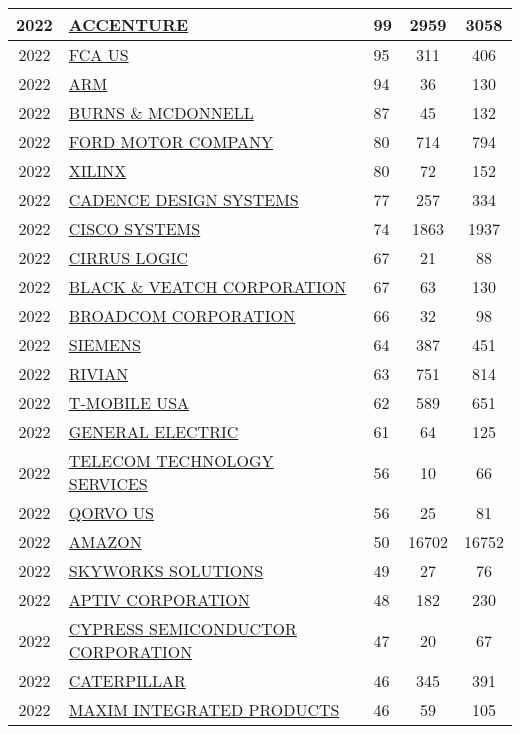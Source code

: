 \documentclass{article}%
\begin{document}
\begin{longtable}{c|p{20em}|p{5em}|c|c}
\hline%
2022&\hyperref[subsec:ACCENTURE]{ACCENTURE}&99&2959&3058\\%
\hline%
2022&\hyperref[subsec:FCAUS]{FCA US}&95&311&406\\%
\hline%
2022&\hyperref[subsec:ARM]{ARM}&94&36&130\\%
\hline%
2022&\hyperref[subsec:BURNSMCDONNELL]{BURNS \& MCDONNELL}&87&45&132\\%
\hline%
2022&\hyperref[subsec:FORDMOTORCOMPANY]{FORD MOTOR COMPANY}&80&714&794\\%
\hline%
2022&\hyperref[subsec:XILINX]{XILINX}&80&72&152\\%
\hline%
2022&\hyperref[subsec:CADENCEDESIGNSYSTEMS]{CADENCE DESIGN SYSTEMS}&77&257&334\\%
\hline%
2022&\hyperref[subsec:CISCOSYSTEMS]{CISCO SYSTEMS}&74&1863&1937\\%
\hline%
2022&\hyperref[subsec:CIRRUSLOGIC]{CIRRUS LOGIC}&67&21&88\\%
\hline%
2022&\hyperref[subsec:BLACKVEATCHCORPORATION]{BLACK \& VEATCH CORPORATION}&67&63&130\\%
\hline%
2022&\hyperref[subsec:BROADCOMCORPORATION]{BROADCOM CORPORATION}&66&32&98\\%
\hline%
2022&\hyperref[subsec:SIEMENS]{SIEMENS}&64&387&451\\%
\hline%
2022&\hyperref[subsec:RIVIAN]{RIVIAN}&63&751&814\\%
\hline%
2022&\hyperref[subsec:T{-}MOBILEUSA]{T{-}MOBILE USA}&62&589&651\\%
\hline%
2022&\hyperref[subsec:GENERALELECTRIC]{GENERAL ELECTRIC}&61&64&125\\%
\hline%
2022&\hyperref[subsec:TELECOMTECHNOLOGYSERVICES]{TELECOM TECHNOLOGY SERVICES}&56&10&66\\%
\hline%
2022&\hyperref[subsec:QORVOUS]{QORVO US}&56&25&81\\%
\hline%
2022&\hyperref[subsec:AMAZON]{AMAZON}&50&16702&16752\\%
\hline%
2022&\hyperref[subsec:SKYWORKSSOLUTIONS]{SKYWORKS SOLUTIONS}&49&27&76\\%
\hline%
2022&\hyperref[subsec:APTIVCORPORATION]{APTIV CORPORATION}&48&182&230\\%
\hline%
2022&\hyperref[subsec:CYPRESSSEMICONDUCTORCORPORATION]{CYPRESS SEMICONDUCTOR CORPORATION}&47&20&67\\%
\hline%
2022&\hyperref[subsec:CATERPILLAR]{CATERPILLAR}&46&345&391\\%
\hline%
2022&\hyperref[subsec:MAXIMINTEGRATEDPRODUCTS]{MAXIM INTEGRATED PRODUCTS}&46&59&105\\%

\end{longtable}
\end{document}
